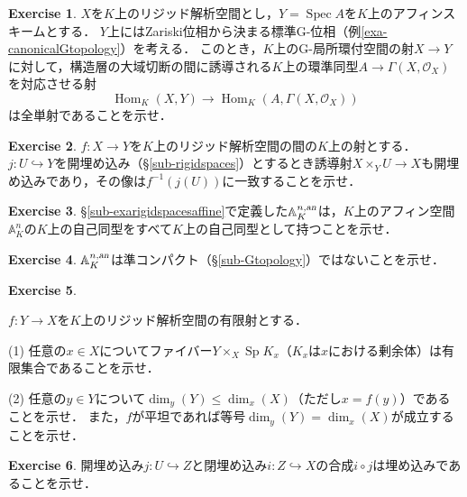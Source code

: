\documentclass[a4paper,12pt, dvipdfmx]{jsbook}
\def\A{\mathbb{A}}
\def\O{\mathscr{O}}
\def\Spec{\mathop{\mathrm{Spec}}\nolimits}
\def\Sp{\mathop{\mathrm{Sp}}\nolimits}
\def\Hom{\mathop{\mathrm{Hom}}\nolimits}
\def\an{\textsl{an}}
\theoremstyle{plain}
\theoremstyle{definition}
\newtheorem{exer}{\bfseries Exercise}[chapter]
\begin{document}
\begin{exer}\label{exer-maptoschemes}{\rm 
$X$を$K$上のリジッド解析空間とし，$Y=\Spec A$を$K$上のアフィンスキームとする．
$Y$上にはZariski位相から決まる標準G-位相（例\ref{exa-canonicalGtopology}）を考える．
このとき，$K$上のG-局所環付空間の射$X\rightarrow Y$に対して，構造層の大域切断の間に誘導される$K$上の環準同型$A\rightarrow\Gamma(X,\O_X)$を対応させる射
$$
\Hom_K(X,Y)\longrightarrow\Hom_K(A,\Gamma(X,\O_X))
$$
は全単射であることを示せ．}
\end{exer}

\begin{exer}\label{exer-fiberproductrigid}{\rm 
$f\colon X\rightarrow Y$を$K$上のリジッド解析空間の間の$K$上の射とする．
$j\colon U\hookrightarrow Y$を開埋め込み（\S\ref{sub-rigidspaces}）とするとき誘導射$X\times_YU\rightarrow X$も開埋め込みであり，その像は$f^{-1}(j(U))$に一致することを示せ．}
\end{exer}

\begin{exer}\label{exer-affineautomorphism}{\rm 
\S\ref{sub-exarigidspacesaffine}で定義した$\A^{n,\an}_K$は，$K$上のアフィン空間$\A^n_K$の$K$上の自己同型をすべて$K$上の自己同型として持つことを示せ．}
\end{exer}


\begin{exer}\label{exer-affinenotqusicompact}{\rm 
$\A^{n,\an}_K$は準コンパクト（\S\ref{sub-Gtopology}）ではないことを示せ．}
\end{exer}

\begin{exer}\label{exer-finitemapfinite}{\rm 
$f\colon Y\rightarrow X$を$K$上のリジッド解析空間の有限射とする．

(1) 任意の$x\in X$についてファイバー$Y\times_X\Sp K_x$（$K_x$は$x$における剰余体）は有限集合であることを示せ．

(2) 任意の$y\in Y$について$\dim_y(Y)\leq\dim_x(X)$（ただし$x=f(y)$）であることを示せ．
また，$f$が平坦であれば等号$\dim_y(Y)=\dim_x(X)$が成立することを示せ．}
\end{exer}

\begin{exer}\label{exer-immersions}{\rm 
開埋め込み$j\colon U\hookrightarrow Z$と閉埋め込み$i\colon Z\hookrightarrow X$の合成$i\circ j$は埋め込みであることを示せ．}
\end{exer}
\end{document}
